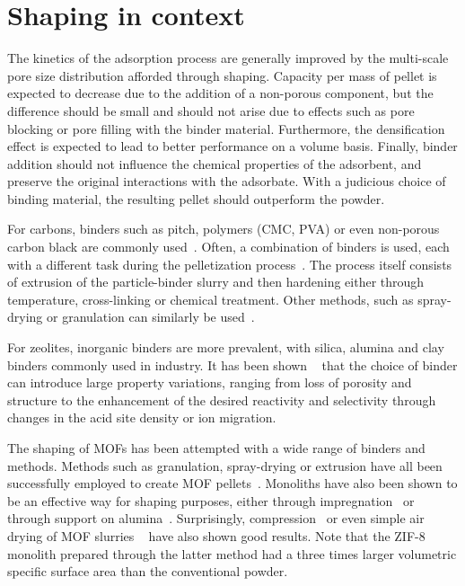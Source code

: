 
\section{Shaping in context}

The kinetics of the adsorption process are generally improved by the 
multi-scale pore size distribution afforded through shaping.
Capacity per mass of pellet is expected to decrease due to the
addition of a non-porous component, but the difference should be 
small and should not arise due to effects such as pore blocking or
pore filling with the binder material.
Furthermore, the densification effect is expected to lead to
better performance on a volume basis.
Finally, binder addition should not influence the chemical properties 
of the adsorbent, and preserve the original interactions with the adsorbate.
With a judicious choice of binding material, the resulting pellet
should outperform the powder.


For carbons, binders such as pitch, polymers (CMC, PVA) or even 
non-porous carbon black are 
commonly used~\cite{ohjiAdvancedProcessingManufacturing2008}.
Often, a combination of binders is used, each with a different task 
during the pelletization process~\cite{bandoszActivatedCarbonSurfaces2006}.
The process itself consists of extrusion of the particle-binder slurry 
and then hardening either through temperature, cross-linking
or chemical treatment. Other methods, such as spray-drying or 
granulation can similarly be 
used~\cite{ruthvenPrinciplesAdsorptionAdsorption1984}.

For zeolites, inorganic binders are more prevalent, with silica, 
alumina and clay binders commonly used in industry. It has been shown
~\cite{whitingcuriouscasezeolite2016, MichelsEffectsBindersPerformance2014}
that the choice of binder can introduce large property variations, ranging 
from loss of porosity and structure to the enhancement of the desired
reactivity and selectivity through changes in the acid site density 
or ion migration.

The shaping of MOFs has been attempted with a wide range of binders
and methods. Methods such as granulation, spray-drying or extrusion have
all been successfully employed to create MOF
pellets~\cite{kaskelChemistryMetalorganicFrameworks2016}.
Monoliths have also been shown to be an effective way for shaping purposes,
either through impregnation~\cite{ramos-fernandezMOFsMeetMonoliths2011} 
or through support on alumina~\cite{aguadoFacileShapingImidazolatebased2010}.
Surprisingly, compression~\cite{bazer-bachiIndustrialUseMetalorganic2014} or
even simple air drying of MOF slurries
~\cite{tianMechanicallyChemicallyRobust2015}
have also shown good results. Note that the ZIF-8 monolith prepared 
through the latter method had a three times larger volumetric 
specific surface area than the conventional powder.


